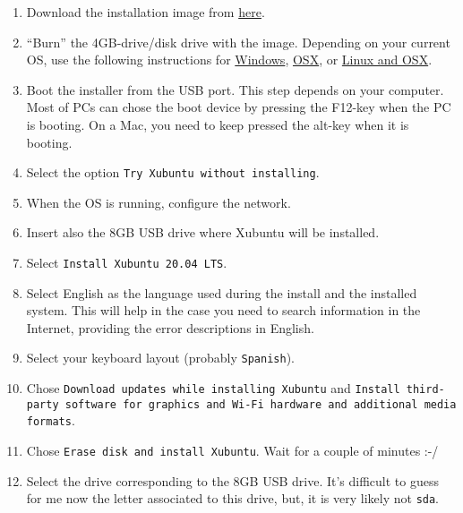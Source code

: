 \begin{enumerate}
  \item Download the installation image from
    \href{https://xubuntu.org/download/}{here}.
    
  \item ``Burn'' the 4GB-drive/disk drive with the
    image. Depending on your current OS, use the following
    instructions for
    \href{https://ubuntu.com/tutorials/create-a-usb-stick-on-windows#1-overview}{Windows},
    \href{https://ubuntu.com/tutorials/create-a-usb-stick-on-macos#1-overview}{OSX},
    or
    \href{https://askubuntu.com/questions/372607/how-to-create-a-bootable-ubuntu-usb-flash-drive-from-terminal}{Linux and OSX}.

\item Boot the installer from the USB port. This step depends on your
  computer. Most of PCs can chose the boot device by pressing the
  F12-key when the PC is booting. On a Mac, you need to keep pressed
  the alt-key when it is booting.
  
\item Select the option \texttt{Try Xubuntu without installing}.
  
\item When the OS is running, configure the network.
  
\item Insert also the 8GB USB drive where Xubuntu will be installed.
  
\item Select \texttt{Install Xubuntu 20.04 LTS}.
  
\item Select English as the language used during the install and the
  installed system. This will help in the case you need to search
  information in the Internet, providing the error descriptions in
  English.
  
\item Select your keyboard layout (probably \texttt{Spanish}).

\item Chose \texttt{Download updates while installing Xubuntu} and
  \texttt{Install third-party software for graphics and Wi-Fi hardware
    and additional media formats}.

\item Chose \texttt{Erase disk and install Xubuntu}. Wait for a couple
  of minutes :-/

\item Select the drive corresponding to the 8GB USB drive. It's
  difficult to guess for me now the letter associated to this drive,
  but, it is very likely not \texttt{sda}.


\end{enumerate}
